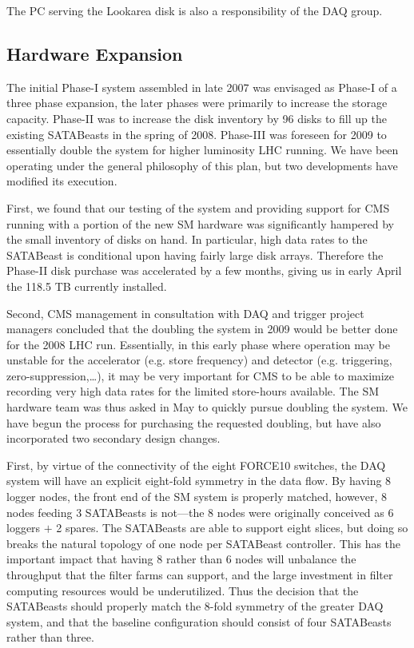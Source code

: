 The PC serving the Lookarea disk is also a responsibility of the DAQ group.


\subsection{Hardware Expansion\label{sec:SMexpansion}}

The initial Phase-I system assembled in late 2007 was envisaged as Phase-I 
of a three phase expansion, the later phases were primarily to increase the
storage capacity.
Phase-II was to increase the disk inventory by 96 disks to fill up the existing
SATABeasts in the spring of 2008.
Phase-III was foreseen for 2009 to essentially double the system for higher 
luminosity LHC running.
We have been operating under the general philosophy of this plan, 
but two developments have modified its execution.

First, we found that our testing of the system and providing support for CMS
running with a portion of the new SM hardware was significantly hampered 
by the small inventory of disks on hand.
In particular, high data rates to the SATABeast is conditional upon having
fairly large disk arrays.
Therefore the Phase-II disk purchase was accelerated by a few months,
giving us in early April the 118.5 TB currently installed.

Second, CMS management in consultation with DAQ and trigger
project managers concluded that the doubling the system in 2009 would be
better done  for the 2008 LHC run.
Essentially, in this early phase where operation may be unstable 
for the accelerator (e.g. store frequency)
and detector (e.g. triggering, zero-suppression,\ldots), 
it may be very important for CMS to be able to maximize  recording very high data rates
for the limited store-hours available.
The SM hardware team  was thus asked in May to quickly pursue doubling the system.
We have begun the process for purchasing the requested doubling, 
but have also incorporated two secondary design changes.

First, by virtue of the connectivity of the eight FORCE10 switches, the DAQ system
will have an explicit eight-fold symmetry in the data flow.
By having 8 logger nodes, the front end of the SM system is properly matched,
however, 8 nodes feeding 3 SATABeasts is not---the 8 nodes were originally 
conceived as 6 loggers $+$ 2 spares.
The SATABeasts are able to support eight slices,
but doing so breaks the natural topology of one node per  SATABeast controller.
This has the important impact that having 8 rather than 6 nodes will unbalance 
the throughput that the filter farms 
can support, and  the large investment in filter computing resources would be underutilized.
Thus the decision that the  SATABeasts should properly match the 8-fold symmetry
of the greater DAQ system, and that the baseline  configuration should consist
of four  SATABeasts rather than three.

